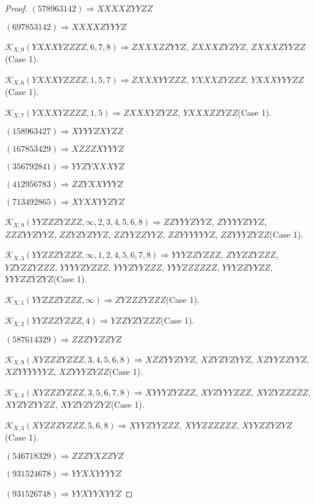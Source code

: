 \documentclass[12pt]{article}
\theoremstyle{plain}
\theoremstyle{definition}
\theoremstyle{remark}
\newcommand{\fancy}[1]{\mathcal{#1}}
\def\K{\fancy{K}}
\begin{document}
\begin{proof}
	$(5 7 8 9 6 3 1 4 2)\Rightarrow XXXXZYYZZ$
	
	$(6 9 7 8 5 3 1 4 2)\Rightarrow XXXXZYYYZ$
	
	
	
	$\K_{X,9}(YXXXYZZZZ,6, 7, 8)\Rightarrow $$ZXXXZZYYZ$, $ZXXXZYZYZ$, $ZXXXZYYZZ$(Case 1).
	
	$\K_{X,6}(YXXXYZZZZ,1, 5, 7)\Rightarrow $$ZXXXYYZZZ$, $YXXXZYZZZ$, $YXXXYYYZZ$(Case 1).
	
	$\K_{X,7}(YXXXYZZZZ,1, 5)\Rightarrow $$ZXXXYZYZZ$, $YXXXZZYZZ$(Case 1).
	
	
	
	$(1 5 8 9 6 3 4 2 7)\Rightarrow XYYYZXYZZ$
	
	$(1 6 7 8 5 3 4 2 9)\Rightarrow XZZZXYYYZ$
	
	$(3 5 6 7 9 2 8 4 1)\Rightarrow YYZYXXXYZ$
	
	$(4 1 2 9 5 6 7 8 3)\Rightarrow ZZYXXYYYZ$
	
	$(7 1 3 4 9 2 8 6 5)\Rightarrow XYXXYYZYZ$
	
	
	
	$\K_{X,9}(YYZZZYZZZ,\infty,2, 3, 4, 5, 6, 8)\Rightarrow $$ZZYYYZYYZ$, $ZYYYYZYYZ$, $ZZZYYZYYZ$, $ZZYZYZYYZ$, $ZZYYZZYYZ$, $ZZYYYYYYZ$, $ZZYYYZYZZ$(Case 1).
	
	$\K_{X,3}(YYZZZYZZZ,\infty,1, 2, 4, 5, 6, 7, 8)\Rightarrow $$YYYZZYZZZ$, $ZYYZZYZZZ$, $YZYZZYZZZ$, $YYYYZYZZZ$, $YYYZYYZZZ$, $YYYZZZZZZ$, $YYYZZYYZZ$, $YYYZZYZYZ$(Case 1).
	
	$\K_{X,1}(YYZZZYZZZ,\infty)\Rightarrow $$ZYZZZYZZZ$(Case 1).
	
	$\K_{X,2}(YYZZZYZZZ,4)\Rightarrow $$YZZYZYZZZ$(Case 1).
	
	
	
	$(5 8 7 6 1 4 3 2 9)\Rightarrow ZZZYYZZYZ$
	
	
	
	$\K_{X,9}(XYZZZYZZZ,3, 4, 5, 6, 8)\Rightarrow $$XZZYYZYYZ$, $XZYZYZYYZ$, $XZYYZZYYZ$, $XZYYYYYYZ$, $XZYYYZYZZ$(Case 1).
	
	$\K_{X,4}(XYZZZYZZZ,3, 5, 6, 7, 8)\Rightarrow $$XYYYZYZZZ$, $XYZYYYZZZ$, $XYZYZZZZZ$, $XYZYZYYZZ$, $XYZYZYZYZ$(Case 1).
	
	$\K_{X,3}(XYZZZYZZZ,5, 6, 8)\Rightarrow $$XYYZYYZZZ$, $XYYZZZZZZ$, $XYYZZYZYZ$(Case 1).
	
	
	
	$(5 4 6 7 1 8 3 2 9)\Rightarrow ZZZYXZZYZ$
	
	$(9 3 1 5 2 4 6 7 8)\Rightarrow YYXXYYYYZ$
	
	$(9 3 1 5 2 6 7 4 8)\Rightarrow YYXYYXYYZ$
	

\end{proof}
\end{document}
